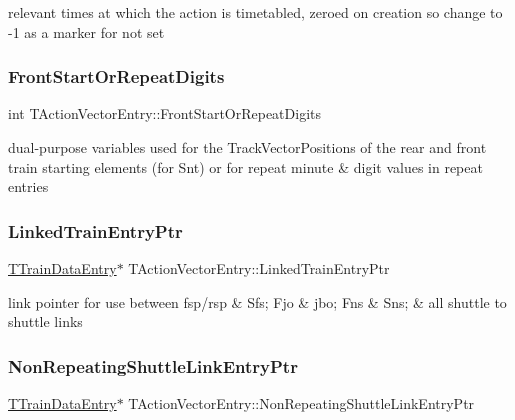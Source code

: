 relevant times at which the action is timetabled, zeroed on creation so change to -\/1 as a marker for \textquotesingle{}not set\textquotesingle{} \mbox{\label{class_t_action_vector_entry_a8b84cb2a020cfb2f81a091f3bdc59ec4}} 
\subsubsection{\texorpdfstring{Front\+Start\+Or\+Repeat\+Digits}{FrontStartOrRepeatDigits}}
{\footnotesize\ttfamily int T\+Action\+Vector\+Entry\+::\+Front\+Start\+Or\+Repeat\+Digits}

dual-\/purpose variables used for the Track\+Vector\+Positions of the rear and front train starting elements (for Snt) or for repeat minute \& digit values in repeat entries \mbox{\label{class_t_action_vector_entry_ab240a52305bd614f1921e86617687abf}} 
\subsubsection{\texorpdfstring{Linked\+Train\+Entry\+Ptr}{LinkedTrainEntryPtr}}
{\footnotesize\ttfamily \mbox{\hyperlink{class_t_train_data_entry}{T\+Train\+Data\+Entry}}$\ast$ T\+Action\+Vector\+Entry\+::\+Linked\+Train\+Entry\+Ptr}

link pointer for use between fsp/rsp \& Sfs; Fjo \& jbo; Fns \& Sns; \& all shuttle to shuttle links \mbox{\label{class_t_action_vector_entry_a921897cd667dd8933de593e97e74a3a7}} 
\subsubsection{\texorpdfstring{Non\+Repeating\+Shuttle\+Link\+Entry\+Ptr}{NonRepeatingShuttleLinkEntryPtr}}
{\footnotesize\ttfamily \mbox{\hyperlink{class_t_train_data_entry}{T\+Train\+Data\+Entry}}$\ast$ T\+Action\+Vector\+Entry\+::\+Non\+Repeating\+Shuttle\+Link\+Entry\+Ptr}


